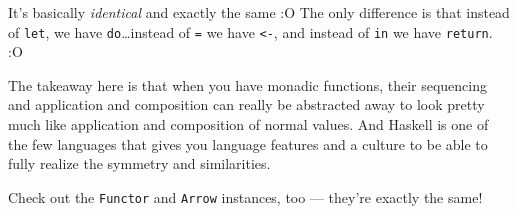 \documentclass[]{article}
\newenvironment{Shaded}{}{}
\newcommand{\CommentTok}[1]{\textcolor[rgb]{0.38,0.63,0.69}{\textit{#1}}}
\newcommand{\DataTypeTok}[1]{\textcolor[rgb]{0.56,0.13,0.00}{#1}}
\newcommand{\FunctionTok}[1]{\textcolor[rgb]{0.02,0.16,0.49}{#1}}
\newcommand{\KeywordTok}[1]{\textcolor[rgb]{0.00,0.44,0.13}{\textbf{#1}}}
\newcommand{\NormalTok}[1]{#1}
\newcommand{\OperatorTok}[1]{\textcolor[rgb]{0.40,0.40,0.40}{#1}}
\newcommand{\OtherTok}[1]{\textcolor[rgb]{0.00,0.44,0.13}{#1}}
\begin{document}
It's basically \emph{identical} and exactly the same :O The only difference is
that instead of \texttt{let}, we have \texttt{do}\ldots instead of \texttt{=} we
have \texttt{\textless{}-}, and instead of \texttt{in} we have \texttt{return}.
:O

The takeaway here is that when you have monadic functions, their sequencing and
application and composition can really be abstracted away to look pretty much
like application and composition of normal values. And Haskell is one of the few
languages that gives you language features and a culture to be able to fully
realize the symmetry and similarities.

Check out the \texttt{Functor} and \texttt{Arrow} instances, too --- they're
exactly the same!

\begin{Shaded}
\end{Shaded}
\end{document}
